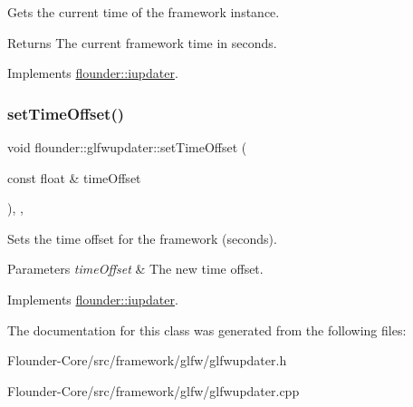 Gets the current time of the framework instance. 

\begin{DoxyReturn}{Returns}
The current framework time in seconds. 
\end{DoxyReturn}


Implements \hyperlink{classflounder_1_1iupdater_aab92d5e84c55e35d1b8a9a4f5628e3b4}{flounder\+::iupdater}.

\mbox{\label{classflounder_1_1glfwupdater_a2cffca6ed4a79dd5d8cc658ca20c70ef}} 
\subsubsection{\texorpdfstring{set\+Time\+Offset()}{setTimeOffset()}}
{\footnotesize\ttfamily void flounder\+::glfwupdater\+::set\+Time\+Offset (\begin{DoxyParamCaption}\item[{const float \&}]{time\+Offset }\end{DoxyParamCaption})\hspace{0.3cm}{\ttfamily [inline]}, {\ttfamily [override]}, {\ttfamily [virtual]}}



Sets the time offset for the framework (seconds). 


\begin{DoxyParams}{Parameters}
{\em time\+Offset} & The new time offset. \\
\hline
\end{DoxyParams}


Implements \hyperlink{classflounder_1_1iupdater_a5ce1862ec2d0e6c4f61b026922379dd2}{flounder\+::iupdater}.



The documentation for this class was generated from the following files\+:\begin{DoxyCompactItemize}
\item 
Flounder-\/\+Core/src/framework/glfw/glfwupdater.\+h\item 
Flounder-\/\+Core/src/framework/glfw/glfwupdater.\+cpp\end{DoxyCompactItemize}
